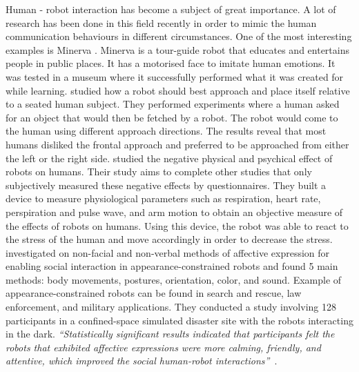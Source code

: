 \documentclass[oneside, a4paper, 12pt]{memoir}
\newcommand{\quot}[1]{\textit{\enquote{#1}}}
\begin{document}
		Human - robot interaction has become a subject of great importance. A lot of research has been done in this field recently in order to mimic the human communication behaviours in different circumstances. One of the most interesting examples is Minerva \citep{thrun1999minerva}. Minerva is a tour-guide robot that educates and entertains people in public places. It has a motorised face to imitate human emotions. It was tested in a museum where it successfully performed what it was created for while learning.
		\citet{dautenhahn2006may} studied how a robot should best approach and place itself
relative to a seated human subject. They performed experiments where a human asked for an object that would then be fetched by a robot. The robot would come to the human using different approach directions. The results reveal that most humans disliked the frontal approach and preferred to be approached from either the left or the right side.
		\citet{itoh2006development} studied the negative physical and psychical effect of robots on humans. Their study aims to complete other studies that only subjectively measured these negative effects by questionnaires. They built a device to measure physiological parameters such as respiration, heart rate, perspiration and pulse wave, and arm motion to obtain an objective measure of the effects of robots on humans. Using this device, the robot was able to react to the stress of the human and move accordingly in order to decrease the stress.
		\citet{bethel2009non} investigated on non-facial and non-verbal methods of affective expression for enabling social interaction in appearance-constrained robots and found 5 main methods: body movements, postures, orientation, color, and sound. Example of appearance-constrained robots can be found in search and rescue, law enforcement, and military applications. They conducted a study involving 128 participants in a confined-space simulated disaster site with the robots interacting in the dark. \quot{Statistically significant results indicated that participants felt the robots that exhibited affective expressions were more calming, friendly, and attentive, which improved the social human-robot interactions}~\citep{bethel2009non}.
		
\end{document}
